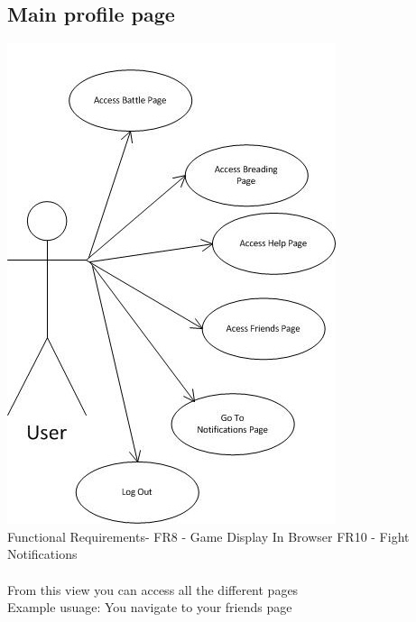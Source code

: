 \documentclass{project}
\begin{document}
\newpage
\subsection{Main profile page}
\includegraphics[scale=0.6]{MainProfilePageUseCase.jpg}
\\
Functional Requirements-
FR8 - Game Display In Browser
FR10 - Fight Notifications
\\
\\
From this view you can access all the different pages
\\
Example usuage: You navigate to your friends page

\newpage
\end{document}
